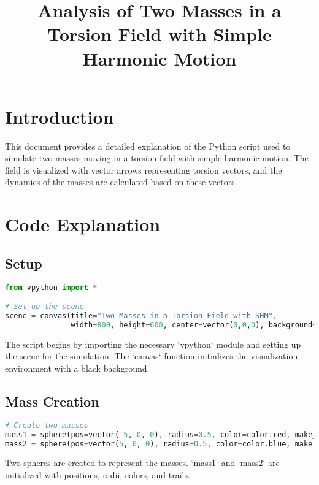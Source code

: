 \documentclass{article}
\begin{document}
\title{Analysis of Two Masses in a Torsion Field with Simple Harmonic Motion}
\author{}
\date{}
\maketitle

\section{Introduction}
This document provides a detailed explanation of the Python script used to simulate two masses moving in a torsion field with simple harmonic motion. The field is visualized with vector arrows representing torsion vectors, and the dynamics of the masses are calculated based on these vectors.

\section{Code Explanation}

\subsection{Setup}
\begin{lstlisting}[language=Python, breaklines=true]
from vpython import *

# Set up the scene
scene = canvas(title="Two Masses in a Torsion Field with SHM",
               width=800, height=600, center=vector(0,0,0), background=color.black)
\end{lstlisting}

The script begins by importing the necessary `vpython` module and setting up the scene for the simulation. The `canvas` function initializes the visualization environment with a black background.

\subsection{Mass Creation}
\begin{lstlisting}[language=Python, breaklines=true]
# Create two masses
mass1 = sphere(pos=vector(-5, 0, 0), radius=0.5, color=color.red, make_trail=True)
mass2 = sphere(pos=vector(5, 0, 0), radius=0.5, color=color.blue, make_trail=True)
\end{lstlisting}

Two spheres are created to represent the masses. `mass1` and `mass2` are initialized with positions, radii, colors, and trails.
\end{document}
